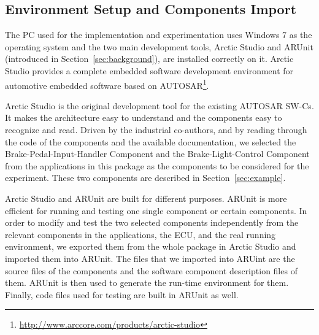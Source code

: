 \subsection{Environment Setup and Components Import}
The PC used for the implementation and experimentation uses Windows 7 as the operating system and the two main development tools, Arctic Studio and ARUnit (introduced in Section~\ref{sec:background}), are installed correctly on it. Arctic Studio provides a complete embedded software development environment for automotive embedded software based on AUTOSAR\footnote{\url{http://www.arccore.com/products/arctic-studio}}. %

Arctic Studio is the original development tool for the existing AUTOSAR SW-Cs. %
It makes the architecture easy to understand and the components easy to recognize and read. Driven by the industrial co-authors, and by reading through the code of the components and the available documentation, we selected the Brake-Pedal-Input-Handler Component and the Brake-Light-Control Component from the applications in this package as the components to be considered for the experiment. These two components are described in Section~\ref{sec:example}.

Arctic Studio and ARUnit are built for different purposes. ARUnit is more efficient for running and testing one single component or certain components. In order to modify and test the two selected components independently from the relevant components in the applications, the ECU, and the real running environment, we exported them from the whole package in Arctic Studio and imported them into ARUnit. The files that we imported into ARUint are the source files of the components and the software component description files of them. ARUnit is then used to generate the run-time environment for them. %
Finally, code files used for testing are built in ARUnit as well. 


